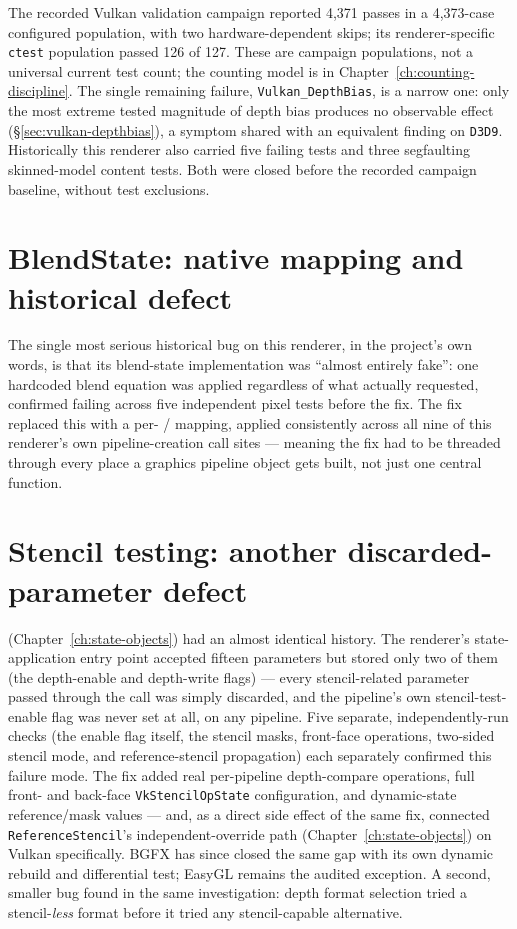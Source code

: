 The recorded Vulkan validation campaign reported 4{,}371 passes in a 4{,}373-case configured
population, with two hardware-dependent skips; its renderer-specific \texttt{ctest} population
passed 126 of 127.  These are campaign populations, not a universal current test count; the
counting model is in Chapter~\ref{ch:counting-discipline}.
The single remaining failure, \texttt{Vulkan\_DepthBias}, is a narrow one: only the most
extreme tested magnitude of depth bias produces no observable effect
(\S\ref{sec:vulkan-depthbias}), a symptom shared with an equivalent finding on
\texttt{D3D9}. Historically this renderer also carried five failing 
tests and three segfaulting skinned-model content tests. Both were closed before the recorded
campaign baseline, without test exclusions.

\section{BlendState: native mapping and historical defect}

The single most serious historical bug on this renderer, in the project's own words, is that
its blend-state implementation was ``almost entirely fake'': one hardcoded blend equation was
applied regardless of what  actually requested, confirmed failing across
five independent pixel tests before the fix. The fix replaced this with a
per- /  mapping, applied consistently across all nine
of this renderer's own pipeline-creation call sites --- meaning the fix had to be threaded
through every place a graphics pipeline object gets built, not just one central function.

\section{Stencil testing: another discarded-parameter defect}

 (Chapter~\ref{ch:state-objects}) had an almost identical
history. The renderer's state-application entry point accepted fifteen parameters but
stored only two of them (the depth-enable and depth-write flags) --- every
stencil-related parameter passed through the call was simply discarded, and the pipeline's
own stencil-test-enable flag was never set at all, on any pipeline. Five separate,
independently-run checks (the enable flag itself, the stencil masks, front-face operations,
two-sided stencil mode, and reference-stencil propagation) each separately confirmed this
failure mode. The fix added real per-pipeline depth-compare operations, full front- and
back-face \texttt{VkStencilOpState} configuration, and dynamic-state reference/mask values ---
and, as a direct side effect of the same fix, connected \texttt{ReferenceStencil}'s
independent-override path (Chapter~\ref{ch:state-objects}) on Vulkan specifically. BGFX has
since closed the same gap with its own dynamic rebuild and differential test; EasyGL remains
the audited exception. A second, smaller bug found in the same investigation: depth
format selection tried a stencil-\emph{less} format before it tried any stencil-capable
alternative.

